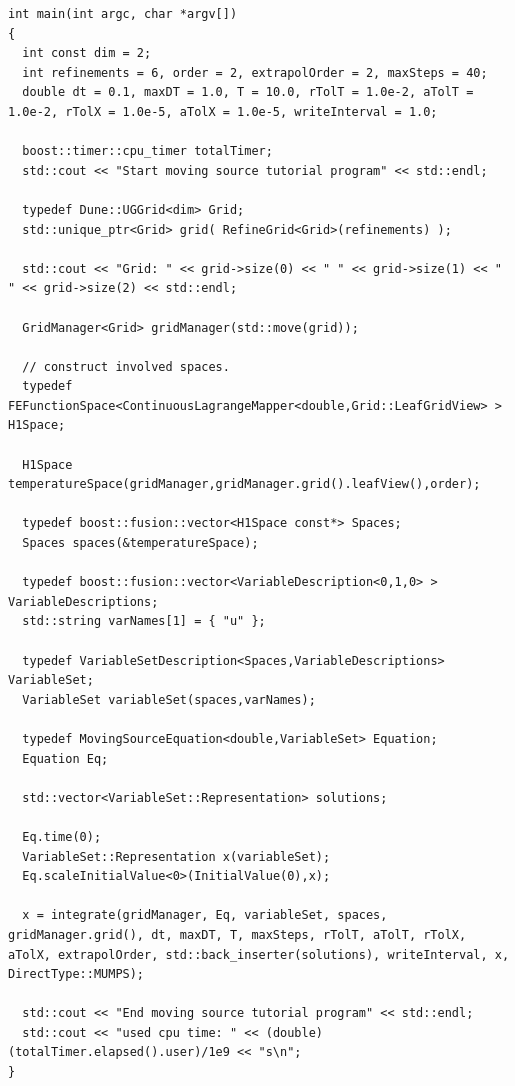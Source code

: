 \documentclass[11pt]{article}
\begin{document}
\begin{lstlisting}
int main(int argc, char *argv[])
{
  int const dim = 2;
  int refinements = 6, order = 2, extrapolOrder = 2, maxSteps = 40;
  double dt = 0.1, maxDT = 1.0, T = 10.0, rTolT = 1.0e-2, aTolT = 1.0e-2, rTolX = 1.0e-5, aTolX = 1.0e-5, writeInterval = 1.0;

  boost::timer::cpu_timer totalTimer;
  std::cout << "Start moving source tutorial program" << std::endl;

  typedef Dune::UGGrid<dim> Grid;
  std::unique_ptr<Grid> grid( RefineGrid<Grid>(refinements) );
    
  std::cout << "Grid: " << grid->size(0) << " " << grid->size(1) << " " << grid->size(2) << std::endl;
 
  GridManager<Grid> gridManager(std::move(grid));
  
  // construct involved spaces.
  typedef FEFunctionSpace<ContinuousLagrangeMapper<double,Grid::LeafGridView> > H1Space;

  H1Space temperatureSpace(gridManager,gridManager.grid().leafView(),order);

  typedef boost::fusion::vector<H1Space const*> Spaces;
  Spaces spaces(&temperatureSpace);

  typedef boost::fusion::vector<VariableDescription<0,1,0> > VariableDescriptions;
  std::string varNames[1] = { "u" };
  
  typedef VariableSetDescription<Spaces,VariableDescriptions> VariableSet;
  VariableSet variableSet(spaces,varNames);

  typedef MovingSourceEquation<double,VariableSet> Equation;
  Equation Eq;

  std::vector<VariableSet::Representation> solutions;

  Eq.time(0);
  VariableSet::Representation x(variableSet);
  Eq.scaleInitialValue<0>(InitialValue(0),x);
	
  x = integrate(gridManager, Eq, variableSet, spaces, gridManager.grid(), dt, maxDT, T, maxSteps, rTolT, aTolT, rTolX, aTolX, extrapolOrder, std::back_inserter(solutions), writeInterval, x, DirectType::MUMPS);

  std::cout << "End moving source tutorial program" << std::endl;
  std::cout << "used cpu time: " << (double)(totalTimer.elapsed().user)/1e9 << "s\n";
}
\end{lstlisting}
\end{document}
